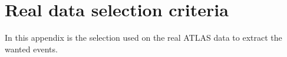 \documentclass{ctuthesis}
\begin{document}
\chapter{Real data selection criteria}
In this appendix is the selection used on the real ATLAS data to extract the wanted events.

\begin{figure}[H]
\end{figure}



\printbibliography

\end{document}

